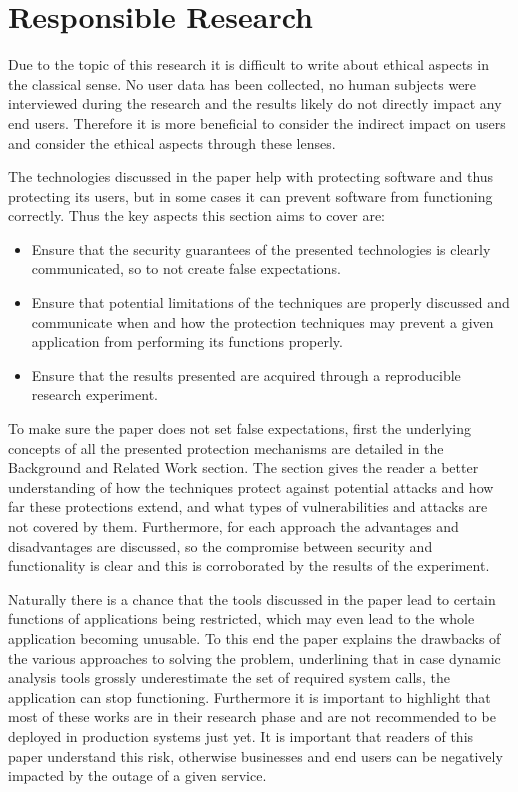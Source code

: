 \section{Responsible Research}
Due to the topic of this research it is difficult to write about ethical aspects in the classical sense. No user data has been collected, no human subjects were interviewed during the research and the results likely do not directly impact any end users.
Therefore it is more beneficial to consider the indirect impact on users and consider the ethical aspects through these lenses.

The technologies discussed in the paper help with protecting software and thus protecting its users, but in some cases it can prevent software from functioning correctly.
Thus the key aspects this section aims to cover are:
\begin{itemize}
    \item Ensure that the security guarantees of the presented technologies is clearly communicated, so to not create false expectations.
    \item Ensure that potential limitations of the techniques are properly discussed and communicate when and how the protection techniques may prevent a given application from performing its functions properly.
    \item Ensure that the results presented are acquired through a reproducible research experiment.
\end{itemize}

To make sure the paper does not set false expectations, first the underlying concepts of all the presented protection mechanisms are detailed in the Background and Related Work section.
The section gives the reader a better understanding of how the techniques protect against potential attacks and how far these protections extend, and what types of vulnerabilities and attacks are not covered by them.
Furthermore, for each approach the advantages and disadvantages are discussed, so the compromise between security and functionality is clear and this is corroborated by the results of the experiment.

Naturally there is a chance that the tools discussed in the paper lead to certain functions of applications being restricted, which may even lead to the whole application becoming unusable.
To this end the paper explains the drawbacks of the various approaches to solving the problem, underlining that in case dynamic analysis tools grossly underestimate the set of required system calls, the application can stop functioning. Furthermore it is important to highlight that most of these works are in their research phase and are not recommended to be deployed in production systems just yet.
It is important that readers of this paper understand this risk, otherwise businesses and end users can be negatively impacted by the outage of a given service.


